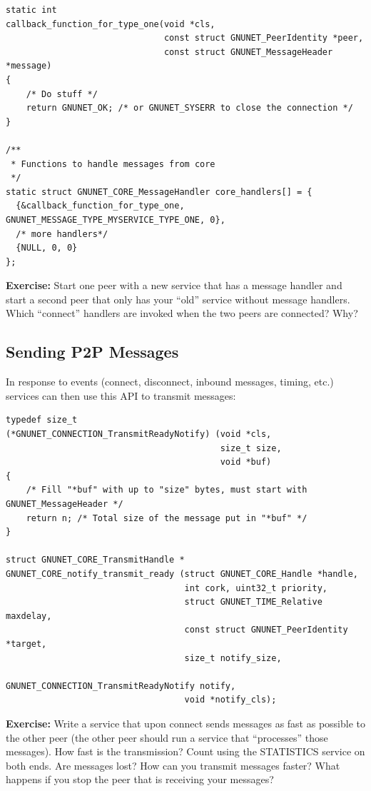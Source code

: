 \documentclass[10pt]{article}
\newcommand{\exercise}[1]{\noindent\begin{boxedminipage}{\textwidth}{\bf Exercise:} #1 \end{boxedminipage}}
\begin{document}
\lstset{language=c}
\begin{lstlisting}
static int
callback_function_for_type_one(void *cls,
                               const struct GNUNET_PeerIdentity *peer,
                               const struct GNUNET_MessageHeader *message)
{
    /* Do stuff */
    return GNUNET_OK; /* or GNUNET_SYSERR to close the connection */
}

/**
 * Functions to handle messages from core
 */
static struct GNUNET_CORE_MessageHandler core_handlers[] = {
  {&callback_function_for_type_one, GNUNET_MESSAGE_TYPE_MYSERVICE_TYPE_ONE, 0},
  /* more handlers*/
  {NULL, 0, 0}
};
\end{lstlisting}

\exercise{Start one peer with a new service that has a message
handler and start a second peer that only has your ``old'' service
without message handlers.  Which ``connect'' handlers are invoked when
the two peers are connected?  Why?}


\subsection{Sending P2P Messages}

In response to events (connect, disconnect, inbound messages, 
timing, etc.) services can then use this API to transmit messages:

\lstset{language=C}
\begin{lstlisting}
typedef size_t 
(*GNUNET_CONNECTION_TransmitReadyNotify) (void *cls,
                                          size_t size, 
                                          void *buf)
{
    /* Fill "*buf" with up to "size" bytes, must start with GNUNET_MessageHeader */
    return n; /* Total size of the message put in "*buf" */
}

struct GNUNET_CORE_TransmitHandle *
GNUNET_CORE_notify_transmit_ready (struct GNUNET_CORE_Handle *handle,
                                   int cork, uint32_t priority,
                                   struct GNUNET_TIME_Relative maxdelay,
                                   const struct GNUNET_PeerIdentity *target,
                                   size_t notify_size,
                                   GNUNET_CONNECTION_TransmitReadyNotify notify,
                                   void *notify_cls);
\end{lstlisting}

\exercise{Write a service that upon connect sends messages as
fast as possible to the other peer (the other peer should run a
service that ``processes'' those messages).  How fast is the
transmission?  Count using the STATISTICS service on both ends.  Are
messages lost? How can you transmit messages faster?  What happens if
you stop the peer that is receiving your messages?}
\end{document}
